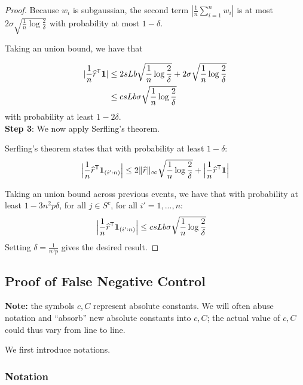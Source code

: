 \begin{proof}
Because $w_i$ is subgaussian, the second term $|\frac{1}{n} \sum_{i=1}^n w_i|$ is at most $2 \sigma \sqrt{ \frac{1}{n} \log \frac{2}{\delta}}$ with probability at most $1-\delta$.

Taking an union bound, we have that 

\begin{align*}
| \frac{1}{n} \widehat{r}^{\mathsf{T}} \mbox{\boldmath $1$}| &\leq 2 sLb \sqrt{\frac{1}{n} \log \frac{2}{\delta}} + 2 \sigma \sqrt{\frac{1}{n} \log \frac{2}{\delta}} \\
  &\leq c sLb \sigma \sqrt{\frac{1}{n} \log \frac{2}{\delta}} 
\end{align*}
with probability at least $1-2\delta$.\\

\textbf{Step 3}: We now apply Serfling's theorem.

Serfling's theorem states that with probability at least $1 - \delta$:
\[
\Big
|\frac{1}{n} \widehat{r}^{\mathsf{T}} \mbox{\boldmath $1$}_{(i':n)}\Big| \leq
   2\| \widehat{r} \|_\infty \sqrt{ \frac{1}{n} \log \frac{2}{\delta}} + 
   \Big|\frac{1}{n} \widehat{r}^{\mathsf{T}} \mbox{\boldmath $1$} \Big|
\]

Taking an union bound across previous events, we have that with probability at least $1 - 3n^2 p \delta$, for all $j \in S^c$, for all $i'=1,...,n$:
\begin{align*}
\Big|\frac{1}{n} \widehat{r}^{\mathsf{T}} \mbox{\boldmath $1$}_{(i':n)} \Big| &\leq
  c sLb \sigma \sqrt{\frac{1}{n} \log \frac{2}{\delta}} 
\end{align*}
Setting $\delta = \frac{1}{n^3 p}$ gives the desired result.

\end{proof}

 
 
 
 \subsection{Proof of False Negative Control}
 \label{sec:false_negative_proof}
 
\textbf{Note:} the symbols $c,C$ represent absolute constants. We will often abuse notation and ``absorb'' new absolute constants into $c, C$; the actual value of $c, C$ could thus vary from line to line.

 We first introduce notations.
 \subsubsection{Notation} 
\label{sec:false_negative_proof_notations}

